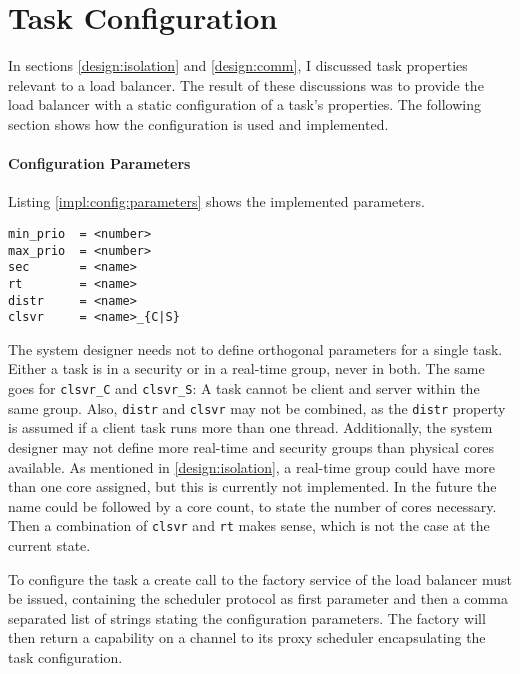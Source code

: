 \pagebreak
\section{Task Configuration}
\label{impl:config}

In sections \ref{design:isolation} and \ref{design:comm}, I discussed
task properties relevant to a load balancer.
The result of these discussions was to provide the load balancer with a static
configuration of a task's properties.
The following section shows how the configuration is used and implemented.

\paragraph{Configuration Parameters}
Listing \ref{impl:config:parameters} shows the implemented parameters.

\begin{lstlisting}[language={[5.2]Lua}, caption={Implemented set of
configuration parameters.},label={impl:config:parameters}]
min_prio  = <number>
max_prio  = <number>
sec       = <name>
rt        = <name>
distr     = <name>
clsvr     = <name>_{C|S}
\end{lstlisting}

The system designer needs not to define orthogonal parameters for
a single task.
Either a task is in a security or in a real-time group, never in both.
The same goes for \texttt{clsvr\_C} and \texttt{clsvr\_S}:
A task cannot be client and server within the same group.
Also, \texttt{distr} and \texttt{clsvr} may not be combined, as the
\texttt{distr} property is assumed if a client task runs more than one thread.
Additionally, the system designer may not define more real-time and security
groups than physical cores available.
As mentioned in \ref{design:isolation}, a real-time group could have more than
one core assigned, but this is currently not implemented.
In the future the name could be followed by a core count, to state the number
of cores necessary.
Then a combination of \texttt{clsvr} and \texttt{rt} makes sense, which is not
the case at the current state.

To configure the task a create call to the factory service of the load
balancer must be issued, containing the scheduler protocol as first parameter
and then a comma separated list of strings stating the configuration
parameters.
The factory will then return a capability on a channel to its proxy scheduler
encapsulating the task configuration.
\begin{comment}
Listing \ref{impl:config:proxy} shows an example for the described create call.

\begin{lstlisting}[language={[5.2]Lua},caption={Create call to the load
balancer factory containing protocol, priority band, and a client-server
group.},label={impl:config:proxy}]
tmFactory:create(
  L4.Proto.Scheduler,
  "min_prio = 0",
  "max_prio = 5",
  "clsvr = A_S")
\end{lstlisting}
\end{comment}

